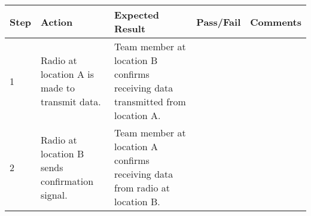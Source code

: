 \documentclass[]{article}
\begin{document}
\begin{longtable}[c]{@{}lllll@{}}
\toprule
\begin{minipage}[b]{0.06\columnwidth}\raggedright\strut
Step
\strut\end{minipage} &
\begin{minipage}[b]{0.08\columnwidth}\raggedright\strut
Action
\strut\end{minipage} &
\begin{minipage}[b]{0.19\columnwidth}\raggedright\strut
Expected Result
\strut\end{minipage} &
\begin{minipage}[b]{0.12\columnwidth}\raggedright\strut
Pass/Fail
\strut\end{minipage} &
\begin{minipage}[b]{0.11\columnwidth}\raggedright\strut
Comments
\strut\end{minipage}\tabularnewline
\midrule
\endhead
\begin{minipage}[t]{0.06\columnwidth}\raggedright\strut
1
\strut\end{minipage} &
\begin{minipage}[t]{0.08\columnwidth}\raggedright\strut
Radio at location A is made to transmit data.
\strut\end{minipage} &
\begin{minipage}[t]{0.19\columnwidth}\raggedright\strut
Team member at location B confirms receiving data transmitted from
location A.
\strut\end{minipage} &
\begin{minipage}[t]{0.12\columnwidth}\raggedright\strut
\strut\end{minipage} &
\begin{minipage}[t]{0.11\columnwidth}\raggedright\strut
\strut\end{minipage}\tabularnewline
\begin{minipage}[t]{0.06\columnwidth}\raggedright\strut
2
\strut\end{minipage} &
\begin{minipage}[t]{0.08\columnwidth}\raggedright\strut
Radio at location B sends confirmation signal.
\strut\end{minipage} &
\begin{minipage}[t]{0.19\columnwidth}\raggedright\strut
Team member at location A confirms receiving data from radio at location
B.
\strut\end{minipage} &
\begin{minipage}[t]{0.12\columnwidth}\raggedright\strut
\strut\end{minipage} &
\begin{minipage}[t]{0.11\columnwidth}\raggedright\strut
\strut\end{minipage}\tabularnewline
\bottomrule
\end{longtable}
\end{document}
